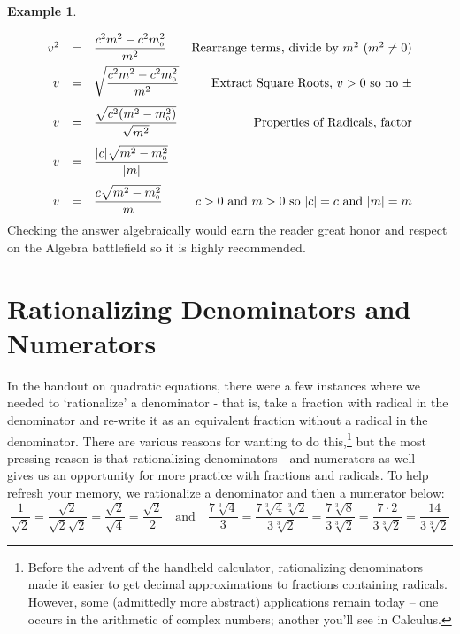 \documentclass[11pt]{article}
\theoremstyle{definition}  %
\newtheorem{ex}{\bf Example}
\begin{document}
\begin{ex}
\begin{enumerate}
\[\begin{array}{rclr}
v^2  & = & \dfrac{c^2 m^2 -c^2m_{\text{\tiny$0$}}^{2}}{m^2} & \text{Rearrange terms, divide by $m^2$ ($m^2 \neq 0$)} \\[8pt]

v & = & \sqrt{\dfrac{c^2 m^2 -c^2m_{\text{\tiny$0$}}^{2}}{m^2}} & \text{Extract Square Roots, $v > 0$ so no $\pm$} \\[12pt]

v & = & \dfrac{\sqrt{c^2 (m^2 -m_{\text{\tiny$0$}}^{2})}}{\sqrt{m^2}} & \text{Properties of Radicals, factor} \\[12pt]

v & = & \dfrac{|c|\sqrt{m^2 -m_{\text{\tiny$0$}}^{2}}}{|m|} &  \\[12pt]

v & = & \dfrac{c\sqrt{m^2 -m_{\text{\tiny$0$}}^{2}}}{m} & \text{$c > 0$ and $m > 0$ so $|c| = c$ and $|m| = m$} \\

\end{array}\] Checking the answer algebraically would earn the reader great honor and respect on the Algebra battlefield so it is highly recommended.

\end{enumerate}

\end{ex}

\section{Rationalizing Denominators and Numerators}

In the handout on quadratic equations, there were a few instances where we needed to `rationalize' a denominator - that is, take a fraction with radical in the denominator and re-write it as an equivalent fraction without a radical in the denominator.  There are various reasons for wanting to do this,\footnote{Before the advent of the handheld calculator, rationalizing denominators made it easier to get decimal approximations to fractions containing radicals.   However, some (admittedly more abstract) applications remain today --  one occurs in the arithmetic of complex numbers; another you'll see in Calculus.} but the most pressing reason is that rationalizing denominators - and numerators as well - gives us an opportunity for more practice with fractions and radicals. To help refresh your memory, we rationalize a denominator and then a numerator below: \[ \dfrac{1}{\sqrt{2}} = \dfrac{\sqrt{2}}{\sqrt{2} \sqrt{2}} = \dfrac{\sqrt{2}}{\sqrt{4}} = \dfrac{\sqrt{2}}{2} \quad \text{and} \quad \dfrac{7\sqrt[3]{4}}{3} = \dfrac{7 \sqrt[3]{4}\sqrt[3]{2}}{3\sqrt[3]{2}} = \dfrac{7\sqrt[3]{8}}{3\sqrt[3]{2}} = \dfrac{7 \cdot 2}{3\sqrt[3]{2}} =  \dfrac{14}{3\sqrt[3]{2}} \]
\end{document}
